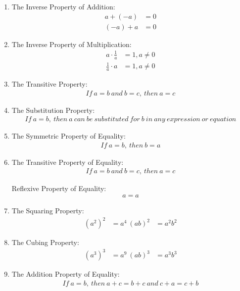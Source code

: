 \documentclass{article}
\begin{document}
\begin{enumerate}
\item The Inverse Property of Addition:
\begin{align*}
a + (-a) &= 0 \\
(-a) + a &= 0
\end{align*}

\item The Inverse Property of Multiplication:
\begin{align*}
a \cdot \frac{1}{a} &= 1, a \neq 0 \\
\frac{1}{a} \cdot a &= 1, a \neq 0
\end{align*}

\item The Transitive Property:
\begin{align*}
If\ a = b\ and\ b = c,\ then\ a = c
\end{align*}

\item The Substitution Property:
\begin{align*}
If\ a = b,\ then\ a\ can\ be\ substituted\ for\ b\ in\ any\ expression\ or\ equation
\end{align*}

\item The Symmetric Property of Equality:
\begin{align*}
If\ a = b,\ then\ b = a
\end{align*}

\item The Transitive Property of Equality:
\begin{align*}
If\ a = b\ and\ b = c,\ then\ a = c
\end{align*}

Reflexive Property of Equality:
\begin{align*}
a = a
\end{align*}

\item The Squaring Property:
\begin{align*}
(a^2)^2 &= a^4 \
(ab)^2 &= a^2b^2
\end{align*}

\item The Cubing Property:
\begin{align*}
(a^3)^3 &= a^9 \
(ab)^3 &= a^3b^3
\end{align*}

\item The Addition Property of Equality:
\begin{align*}
If\ a = b,\ then\ a + c = b + c\ and\ c + a = c + b
\end{align*}


\end{enumerate}
\end{document}
